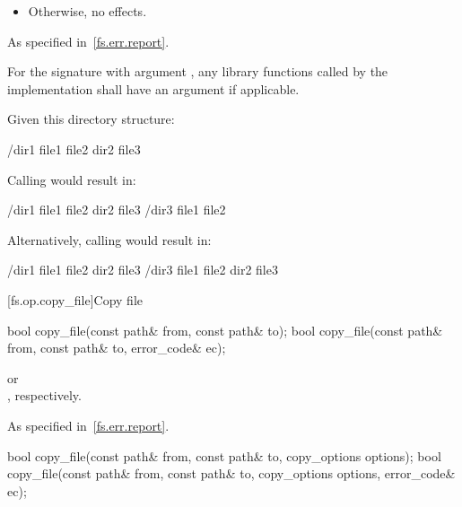 \begin{itemdescr}
\begin{itemize}
\item
Otherwise, no effects.
\end{itemize}

\pnum
\throws As specified in~\ref{fs.err.report}.

\pnum
\remarks For the signature with argument , any
library functions called by the implementation shall have an  argument if applicable.

\pnum
\begin{example} Given this directory structure:
\begin{codeblock}
/dir1
  file1
  file2
  dir2
    file3
\end{codeblock}

Calling  would result in:
\begin{codeblock}
/dir1
  file1
  file2
  dir2
    file3
/dir3
  file1
  file2
\end{codeblock}

Alternatively, calling  would result in:
\begin{codeblock}
/dir1
  file1
  file2
  dir2
    file3
/dir3
  file1
  file2
  dir2
    file3
\end{codeblock}
\end{example}

\end{itemdescr}


[fs.op.copy_file]{Copy file}

%
\begin{itemdecl}
bool copy_file(const path& from, const path& to);
bool copy_file(const path& from, const path& to, error_code& ec);
\end{itemdecl}

\begin{itemdescr}
\pnum
\returns {} or\\
, respectively.

\pnum
\throws As specified in~\ref{fs.err.report}.

\end{itemdescr}

%
\begin{itemdecl}
bool copy_file(const path& from, const path& to, copy_options options);
bool copy_file(const path& from, const path& to, copy_options options,
               error_code& ec);
\end{itemdecl}

